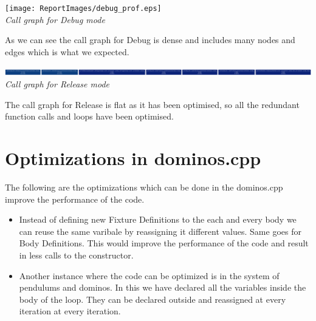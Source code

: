 \documentclass[11pt, a4paper]{article}
\begin{document}
\begin{center}
\texttt{[image: ReportImages/debug\_prof.eps]} \\
\emph{Call graph for Debug mode}
\end{center}


As we can see the call graph for Debug is dense and includes many nodes and edges which is what we expected.

\begin{center}
\includegraphics[scale=0.3]{ReportImages/release_prof.eps} \\
\emph{Call graph for Release mode}
\end{center}



The call graph for Release is flat as it has been optimised, so all the redundant function calls and loops have been optimised.

\section{Optimizations in dominos.cpp}
The following are the optimizations which can be done in the dominos.cpp improve the performance of the code.

\begin{itemize}

\item Instead of defining new Fixture Definitions to the each and every body we can reuse the same varibale by reassigning it different values. Same goes for Body Definitions. This would improve the performance of the code and result in less calls to the constructor.
\item Another instance where the code can be optimized is in the system of pendulums and dominos. In this we have declared all the variables inside the body of the loop. They can be declared outside and reassigned at every iteration at every iteration.

\end{itemize}





\end{document}
